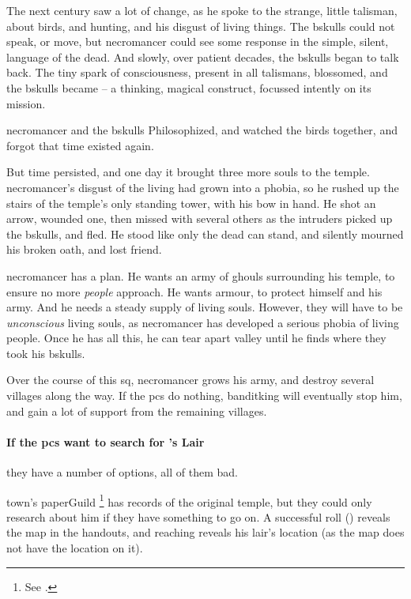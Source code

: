 \begin{exampletext}
  The next century saw a lot of change, as he spoke to the strange, little \gls{talisman}, about birds, and hunting, and his disgust of living things.
  The \gls{bskulls} could not speak, or move, but \gls{necromancer} could see some response in the simple, silent, language of the dead.
  And slowly, over patient decades, the \gls{bskulls} began to talk back.
  The tiny spark of consciousness, present in all \glspl{talisman}, blossomed, and the \gls{bskulls} became  -- a thinking, magical construct, focussed intently on its mission.

  \Gls{necromancer} and the \gls{bskulls} Philosophized, and watched the birds together, and forgot that time existed again.

  But time persisted, and one day it brought three more souls to the temple.
  \Gls{necromancer}'s disgust of the living had grown into a phobia, so he rushed up the stairs of the temple's only standing tower, with his bow in hand.
  He shot an arrow, wounded one, then missed with several others as the intruders picked up the \gls{bskulls}, and fled.
  He stood like only the dead can stand, and silently mourned his broken oath, and lost friend.
\end{exampletext}

\Gls{necromancer} has a plan.
He wants an army of ghouls surrounding his temple, to ensure no more \emph{people} approach.
He wants armour, to protect himself and his army.
And he needs a steady supply of living souls.
However, they will have to be \textit{unconscious} living souls, as \gls{necromancer} has developed a serious phobia of living people.
Once he has all this, he can tear apart \gls{valley} until he finds where they took his \gls{bskulls}.

Over the course of this \gls{sq}, \gls{necromancer} grows his army, and destroy several \glspl{village} along the way.
If the \glspl{pc} do nothing, \gls{banditking} will eventually stop him, and gain a lot of support from the remaining \glspl{village}.

\paragraph{If the \glspl{pc} want to search for 's Lair}
\label{huntingNecro}
they have a number of options, all of them bad.

\Gls{town}'s \gls{paperGuild}%
\footnote{See .}
has records of the original temple, but they could only research about him if they have something to go on.
A successful  roll (\tn[12]) reveals the map in the handouts, and reaching \tn[14] reveals his lair's location (as the map does not have the location on it).

